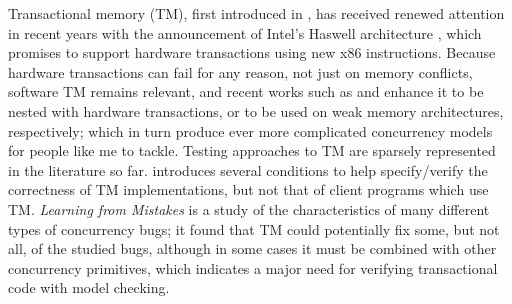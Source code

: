 Transactional memory (TM), first introduced in \cite{transactional-memory},
has received renewed attention in recent years with the announcement of Intel's Haswell architecture \cite{htm-haswell},
which promises to support hardware transactions using new x86 instructions.
Because hardware transactions can fail for any reason, not just on memory conflicts,
software TM remains relevant,
and recent works such as \cite{hybrid-htm-stm} and \cite{stm-relaxed-memory} enhance it to be nested with hardware transactions, or to be used on weak memory architectures, respectively;
which in turn produce ever more complicated concurrency models for people like me to tackle.
%
Testing approaches to TM are sparsely represented in the literature so far.
\cite{specifying-verifying-tm} introduces several conditions to help specify/verify the correctness of TM implementations,
but not that of client programs which use TM.
{\em Learning from Mistakes} \cite{learning-from-mistakes} is a study of the characteristics of many different types of concurrency bugs;
it found that TM could potentially fix some, but not all, of the studied bugs,
although in some cases it must be combined with other concurrency primitives,
which indicates a major need for verifying transactional code with model checking.
